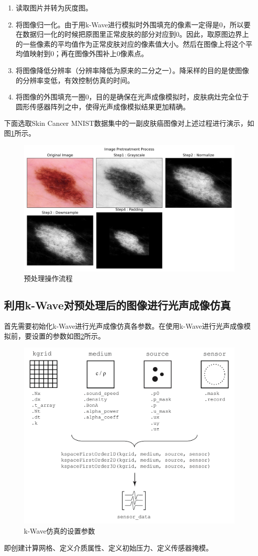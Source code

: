 \begin{enumerate}
	\item 读取图片并转为灰度图。
	\item 将图像归一化。由于用k-Wave进行模拟时外围填充的像素一定得是0，所以要在数据归一化的时候把原图里正常皮肤的部分对应到0。因此，取原图边界上的一些像素的平均值作为正常皮肤对应的像素值大小。然后在图像上将这个平均值映射到0；再在图像外围补上0像素点。
	\item 将图像降低分辨率（分辨率降低为原来的二分之一）。降采样的目的是使图像的分辨率变低，有效控制仿真的时间。
	\item 将图像的外围填充一圈0，目的是确保在光声成像模拟时，皮肤病灶完全位于圆形传感器阵列之中，使得光声成像模拟结果更加精确。
\end{enumerate}

下面选取Skin Cancer MNIST数据集中的一副皮肤癌图像对上述过程进行演示，如图\ref{img402}所示。

\begin{figure}[h]
	\centering
	\includegraphics[width=0.9\columnwidth]{image/chap04/img402.png}
	\caption{预处理操作流程}
	\label{img402}
\end{figure}

\subsection{利用k-Wave对预处理后的图像进行光声成像仿真}
首先需要初始化k-Wave进行光声成像仿真各参数。在使用k-Wave进行光声成像模拟前，要设置的参数如图\ref{img403}所示。

\begin{figure}[h]
	\centering
	\includegraphics[width=0.6\columnwidth]{image/chap04/img403.png}
	\caption{k-Wave仿真的设置参数\cite{treeby2010k}}
	\label{img403}
\end{figure}
即创建计算网格、定义介质属性、定义初始压力、定义传感器掩模。

